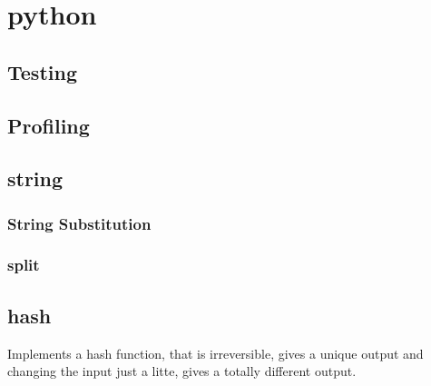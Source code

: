 \documentclass[12pt]{article}
\begin{document}
\maketitle

\section{python}

\subsection{Testing}
\scriptsize


\subsection{Profiling}


\subsection{string}

\subsubsection{String Substitution}



\subsubsection{split}


	

\subsection{hash}

Implements a hash function, that is irreversible, gives a unique output and changing the input just a litte, gives a totally different output.
\end{document}
